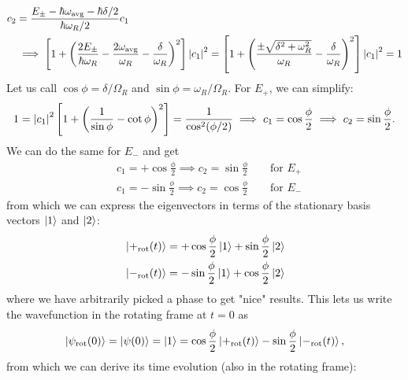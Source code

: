 \documentclass{book}
\theoremstyle{definition}
\newcommand{\f}[2]{\frac{#1}{#2}}
\newcommand{\lp}{\left(}
\newcommand{\rp}{\right)}
\newcommand{\lb}{\left[}
\newcommand{\rb}{\right]}
\begin{document}
	\begin{align*}
		c_2 &=  \f{E_\pm - \hbar \omega_\text{avg} - \hbar \delta/2}{\hbar \omega_R/2} c_1 \\
		&\implies \lb 1 + \lp \f{2E_\pm}{\hbar \omega_R}  - \f{2\omega_\text{avg}}{\omega_R} - \f{\delta}{\omega_R}\rp^2 \rb \abs{c_1}^2 = \lb 1 + \lp  \f{\pm \sqrt{\delta^2+\omega_R^2}}{\omega_R} - \f{\delta}{\omega_R}\rp^2 \rb \abs{c_1}^2 = 1
	\end{align*}
	Let us call $\cos\phi = \delta/\Omega_R$ and $\sin\phi = \omega_R / \Omega_R$. For $E_+$, we can simplify:
	\begin{align*}
		1 = \abs{c_1}^2 \lb 1+ \lp \f{1}{\sin\phi} - \cot\phi \rp^2 \rb = \f{1}{\cos^2(\phi/2)} \implies c_1 = \cos\f{\phi}{2} \implies c_2 = \sin\f{\phi}{2}.
	\end{align*}
	We can do the same for $E_-$ and get
	\begin{align*}
		&c_1 = +\cos\f{\phi}{2} \implies c_2 = \sin\f{\phi}{2} \quad\quad\text{for } E_+\\
		&c_1 = -\sin\f{\phi}{2} \implies c_2 = \cos\f{\phi}{2} \quad\quad\text{for } E_-
	\end{align*}
	from which we can express the eigenvectors in terms of the stationary basis vectors $\ket{1}$ and $\ket{2}$:
	\begin{align*}
		&\ket{+_\text{rot}(t)} = +\cos \f{\phi}{2} \ket{1} + \sin\f{\phi}{2}\ket{2} \\
		&\ket{-_\text{rot}(t)} = -\sin \f{\phi}{2} \ket{1} + \cos\f{\phi}{2}\ket{2}
	\end{align*}
	where we have arbitrarily picked a phase to get "nice" results. This lets us write the wavefunction in the rotating frame at $t=0$ as 
	\begin{align*}
		\ket{\psi_\text{rot}(0)} = \ket{\psi(0)} = \ket{1} = \cos\f{\phi}{2}\ket{+_\text{rot}(t)} -\sin\f{\phi}{2}\ket{-_\text{rot}(t)},
	\end{align*}
	from which we can derive its time evolution (also in the rotating frame):
\end{document}
